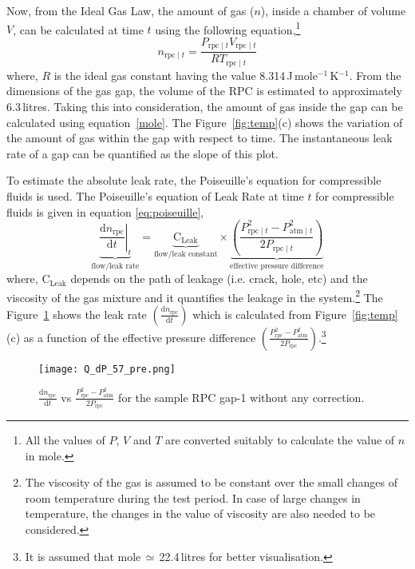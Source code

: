 Now, from the Ideal Gas Law, the amount of gas ($n$), inside a chamber of volume $V$, can be calculated at time $t$ using the following equation,\footnote{All the values of $P$, $V$ and $T$ are converted suitably to calculate the value of $n$ in mole.}
\begin{equation}
  n_{\textrm{rpc}\mid t}=\frac{P_{\textrm{rpc}\mid t}V_{\textrm{rpc}\mid t}}{RT_{\textrm{rpc}\mid t}} \label{mole}
\end{equation}
where, $R$ is the ideal gas constant having the value 8.314\,J\,mole$^{-1}$\,K$^{-1}$. From the dimensions of the gas gap, the volume of the RPC is estimated to approximately 6.3\,litres. Taking this into consideration, the amount of gas inside the gap can be calculated using equation~\ref{mole}. The Figure~\ref{fig:temp}(c) shows the variation of the amount of gas within the gap with respect to time. The instantaneous leak rate of a gap can be quantified as the slope of this plot.

To estimate the absolute leak rate, the Poiseuille's equation for compressible fluids\cite{poiseuille} is used. The Poiseuille's equation of Leak Rate at time $t$ for compressible fluids is given in equation \ref{eq:poiseuille},
\begin{equation}
  \underbrace{\left.\frac{\mathrm{d}n_{\textrm{rpc}}}{\mathrm{d}t}\right| _t}_\text{flow/leak rate}=\underbrace{\textrm{C}_{\textrm{Leak}}}_\text{flow/leak constant}\times\underbrace{\left(\frac {P_{{\textrm{rpc}\mid t} }^{2}-P_{{\textrm{atm}\mid t} }^{2}}{2P_{{\textrm{rpc}\mid t} }}\right)}_\text{effective pressure difference}\label{eq:poiseuille}
\end{equation}
where, $\textrm{C}_{\textrm{Leak}}$ depends on the path of leakage (i.e. crack, hole, etc) and the viscosity of the gas mixture and it quantifies the leakage in the system.\footnote{The viscosity of the gas is assumed to be constant over the small changes of room temperature during the test period. In case of large changes in temperature, the changes in the value of viscosity are also needed to be considered.} The Figure~\ref{fig:preQt} shows the leak rate $\left(\frac{\mathrm{d}n_{\textrm{rpc}}}{\mathrm{d}t}\right)$ which is calculated from Figure~\ref{fig:temp}(c) as a function of the effective pressure difference $\left(\frac{P_{\textrm{rpc}}^{2}-P_{\textrm{atm}}^{2}}{2P_{\textrm{rpc}}}\right)$.\footnote{It is assumed that mole\,$\simeq$\,22.4\,litres for better visualisation.} 
\begin{figure}
  \centering
  \texttt{[image: Q\_dP\_57\_pre.png]}
  \caption{$\frac{\mathrm{d}n_{\textrm{rpc}}}{\mathrm{d}t}$ vs $\frac{P_{\textrm{rpc}}^{2}-P_{\textrm{atm}}^{2}}{2P_{\textrm{rpc}}}$ for the sample RPC gap-1 without any correction.}
  \label{fig:preQt}
\end{figure}

